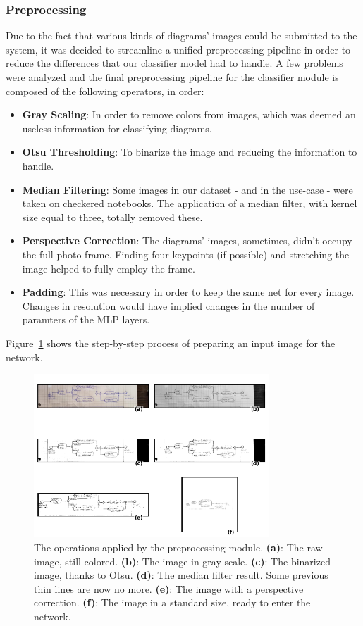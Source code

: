 \documentclass[conference]{IEEEtran}
\begin{document}
\subsubsection{Preprocessing}
Due to the fact that various kinds of diagrams' images could be submitted to the system, it was decided to streamline a unified preprocessing pipeline in order to reduce the differences that our classifier model had to handle. A few problems were analyzed and the final preprocessing pipeline for the classifier module is composed of the following operators, in order:
\begin{itemize}
	\item \textbf{Gray Scaling}: In order to remove colors from images, which was deemed an useless information for classifying diagrams.
	\item \textbf{Otsu Thresholding}: To binarize the image and reducing the information to handle.
	\item \textbf{Median Filtering}: Some images in our dataset - and in the use-case - were taken on checkered notebooks. The application of a median filter, with kernel size equal to three, totally removed these.
	\item \textbf{Perspective Correction}: The diagrams' images, sometimes, didn't occupy the full photo frame. Finding four keypoints (if possible) and stretching the image helped to fully employ the frame.
	\item \textbf{Padding}: This was necessary in order to keep the same net for every image. Changes in resolution would have implied changes in the number of paramters of the MLP layers.
\end{itemize}

Figure~\ref{fig:classifier_preprocessing} shows the step-by-step process of preparing an input image for the network.

\begin{figure}[H]
	\centering
	\includegraphics[width=250pt]{classifier_preprocessing.png}
	\caption{
		The operations applied by the preprocessing module.
		\textbf{(a)}: The raw image, still colored.
		\textbf{(b)}: The image in gray scale.
		\textbf{(c)}: The binarized image, thanks to Otsu.
		\textbf{(d)}: The median filter result. Some previous thin lines are now no more.
		\textbf{(e)}: The image with a perspective correction.
		\textbf{(f)}: The image in a standard size, ready to enter the network.
	}
	\label{fig:classifier_preprocessing}
\end{figure} 
\end{document}
